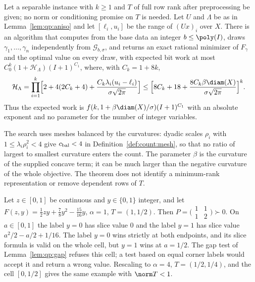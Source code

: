 \begin{theorem}\label{thm:qp:sep-gauss}
Let a separable instance with $k\ge1$ and $T$ of full row rank after
preprocessing be given; no norm or conditioning promise on $T$ is needed. Let
$U$ and $\Lambda$ be as in Lemma~\ref{lem:qp:aniso} and let $[\ell_i,u_i]$ be
the range of $(Ux)_i$ over $X$. There is an algorithm that computes from the
base data an integer $b\le\poly(I)$, draws $\gamma_1,\dots,\gamma_n$
independently from $\mathcal G_{b,\sigma}$, and returns an exact rational
minimizer of $F_\gamma$ and the optimal value on every draw, with expected bit
work at most $C_0^k(1+\mathcal H_\Lambda)(I+1)^{C_1}$, where, with
$C_k=1+8k$,
\[
 \mathcal H_\Lambda=\prod_{i=1}^k\Bigl[2+4(2C_k+4)+\frac{C_k\lambda_i(u_i-\ell_i)}{\sigma\sqrt{2\pi}}\Bigr]
 \le\Bigl[8C_k+18+\frac{8C_k\beta\diam(X)}{\sigma\sqrt{2\pi}}\Bigr]^k .
\]
Thus the expected work is $f(k,1+\beta\diam(X)/\sigma)(I+1)^{C_1}$ with an
absolute exponent and no parameter for the number of integer variables.
\end{theorem}

The search uses meshes balanced by the curvatures: dyadic scales $\rho_i$
with $1\le\lambda_i\rho_i^2<4$ give $c_{\rm bal}<4$ in
Definition~\ref{def:count:mesh}, so that no ratio of largest to smallest
curvature enters the count. The parameter $\beta$ is the curvature of the
supplied concave term; it can be much larger than the negative curvature of
the whole objective. The theorem does not identify a minimum-rank
representation or remove dependent rows of $T$.

\begin{example}\label{ex:qp:corner-labels}
Let $z\in[0,1]$ be continuous and $y\in\{0,1\}$ integer, and let
$F(z,y)=\frac12zy+\frac78y^2-\frac{15}{16}y$, $\alpha=1$, $T=(1,1/2)$. Then
$P=\bigl(\begin{smallmatrix}1&1\\1&2\end{smallmatrix}\bigr)\succ0$. On
$a\in[0,1]$ the label $y=0$ has slice value $0$ and the label $y=1$ has slice
value $a^2/2-a/2+1/16$. The label $y=0$ wins strictly at both endpoints, and
its slice formula is valid on the whole cell, but $y=1$ wins at $a=1/2$. The
gap test of Lemma~\ref{lem:qp:gap} refuses this cell; a test based on equal
corner labels would accept it and return a wrong value. Rescaling to
$\alpha=4$, $T=(1/2,1/4)$, and the cell $[0,1/2]$ gives the same example with
$\norm T<1$.
\end{example}

